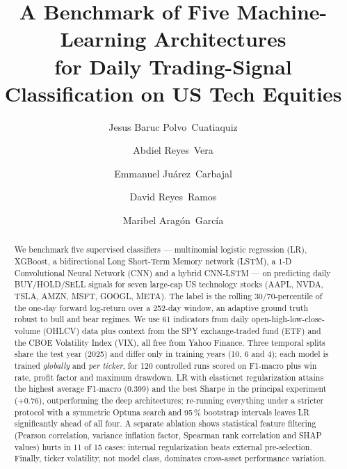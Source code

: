 \documentclass[runningheads]{llncs}
\begin{document}
\title{A Benchmark of Five Machine-Learning Architectures \\for Daily Trading-Signal Classification on US Tech Equities}


\author{Jesus Baruc Polvo~Cuatiaquiz \and
Abdiel Reyes~Vera \and
Emmanuel Ju\'arez~Carbajal \and
David Reyes~Ramos \and
Maribel Arag\'on~Garc\'ia}



\maketitle

\begin{abstract}
We benchmark five supervised classifiers --- multinomial logistic regression (LR), XGBoost, a bidirectional Long Short-Term Memory network (LSTM), a 1-D Convolutional Neural Network (CNN) and a hybrid CNN-LSTM --- on predicting daily BUY/HOLD/SELL signals for seven large-cap US technology stocks (AAPL, NVDA, TSLA, AMZN, MSFT, GOOGL, META). The label is the rolling 30/70-percentile of the one-day forward log-return over a 252-day window, an adaptive ground truth robust to bull and bear regimes. We use 61 indicators from daily open-high-low-close-volume (OHLCV) data plus context from the SPY exchange-traded fund (ETF) and the CBOE Volatility Index (VIX), all free from Yahoo Finance. Three temporal splits share the test year (2025) and differ only in training years (10, 6 and 4); each model is trained \emph{globally} and \emph{per ticker}, for 120 controlled runs scored on F1-macro plus win rate, profit factor and maximum drawdown. LR with elasticnet regularization attains the highest average F1-macro (0.399) and the best Sharpe in the principal experiment (+0.76), outperforming the deep architectures; re-running everything under a stricter protocol with a symmetric Optuna search and 95\,\% bootstrap intervals leaves LR significantly ahead of all four. A separate ablation shows statistical feature filtering (Pearson correlation, variance inflation factor, Spearman rank correlation and SHAP values) hurts in 11 of 15 cases: internal regularization beats external pre-selection. Finally, ticker volatility, not model class, dominates cross-asset performance variation.
\end{abstract}
\end{document}
